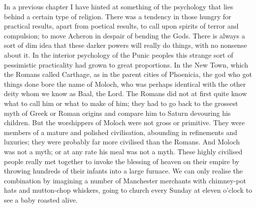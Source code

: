 In a previous chapter I have hinted at something of the psychology that lies behind a certain type of religion. There was a tendency in those hungry for practical results, apart from poetical results, to call upon spirits of terror and compulsion; to move Acheron in despair of bending the Gods. There is always a sort of dim idea that these darker powers will really do things, with no nonsense about it. In the interior psychology of the Punic peoples this strange sort of pessimistic practicality had grown to great proportions. In the New Town, which the Romans called Carthage, as in the parent cities of Phoenicia, the god who got things done bore the name of Moloch, who was perhaps identical with the other deity whom we know as Baal, the Lord. The Romans did not at first quite know what to call him or what to make of him; they had to go back to the grossest myth of Greek or Roman origins and compare him to Saturn devouring his children. But the worshippers of Moloch were not gross or primitive. They were members of a mature and polished civilisation, abounding in refinements and luxuries; they were probably far more civilised than the Romans. And Moloch was not a myth; or at any rate his meal was not a myth. These highly civilised people really met together to invoke the blessing of heaven on their empire by throwing hundreds of their infants into a large furnace. We can only realise the combination by imagining a number of Manchester merchants with chimney-pot hats and mutton-chop whiskers, going to church every Sunday at eleven o'clock to see a baby roasted alive.

